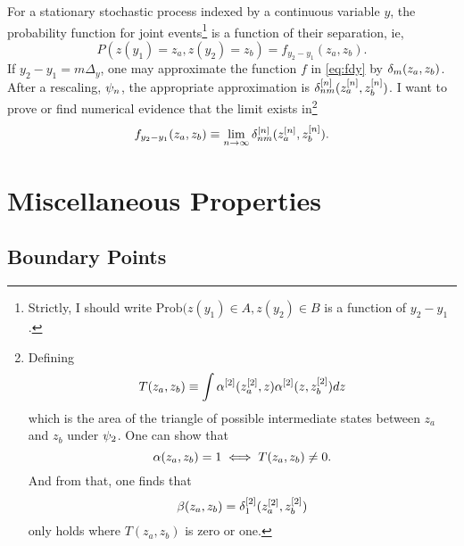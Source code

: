\documentclass[twocolumn]{article}
\begin{document}
For a stationary stochastic process indexed by a continuous variable
$y$, the probability function for joint events\footnote{Strictly, I
  should write $\text{Prob}(z(y_1)\in A, z(y_2) \in B$ is a function
  of $y_2-y_1$.} is a function of their separation, ie,
\begin{equation}
  \label{eq:fdy}
  P(z(y_1)=z_a, z(y_2)=z_b) = f_{y_2-y_1}(z_a,z_b).
\end{equation}
If $y_2-y_1 = m\Delta_y$, one may approximate the function $f$ in
\eqref{eq:fdy} by $\delta_{m}(z_a,z_b)$.  After a rescaling,
$\psi_{n}$, the appropriate approximation is
$\delta_{nm}^{[n]}(z_a^{[n]},z_b^{[n]})$.  I want to prove or find
numerical evidence that the limit exists in\footnote{Defining
  \begin{equation*}
    T(z_a,z_b) \equiv \int \alpha^{[2]}(z_a^{[2]}, z)
    \alpha^{[2]} (z, z_b^{[2]}) dz
  \end{equation*}
  which is the area of the triangle of possible intermediate states
  between $z_a$ and $z_b$ under $\psi_{2}$.  One can show that
  \begin{equation*}
    \alpha(z_a,z_b) = 1 \iff T(z_a,z_b) \neq 0.
  \end{equation*}
  And from that, one finds that
  \begin{equation*}
  \beta(z_a,z_b) = \delta_{1}^{[2]}(z_a^{[2]},z_b^{[2]})
  \end{equation*}
  only holds where $T(z_a,z_b)$ is zero or one.}
\begin{equation}
  \label{eq:flim}
  f_{y_2-y_1}(z_a,z_b) \equiv \lim_{n\rightarrow \infty}
  \delta_{nm}^{[n]}(z_a^{[n]},z_b^{[n]}).
\end{equation}

\section{Miscellaneous Properties}
\label{sec:properties}

\subsection{Boundary Points}
\label{sec:boundary}
\end{document}
